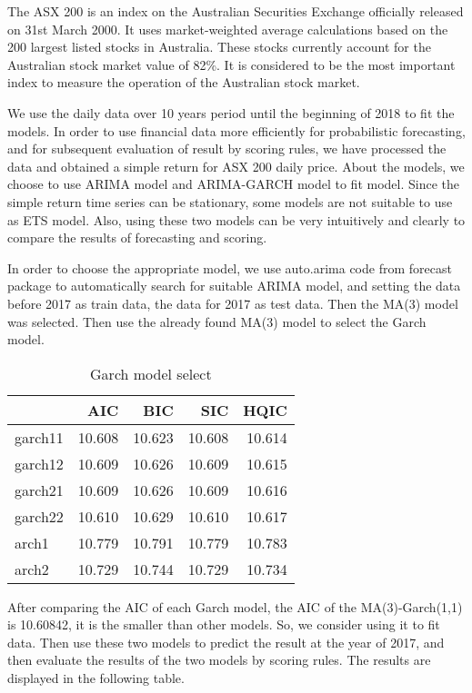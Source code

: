 \documentclass{monashthesis}
\theoremstyle{definition}
\theoremstyle{definition}
\theoremstyle{definition}
\theoremstyle{remark}
\begin{document}
The ASX 200 is an index on the Australian Securities Exchange officially
released on 31st March 2000. It uses market-weighted average
calculations based on the 200 largest listed stocks in Australia. These
stocks currently account for the Australian stock market value of 82\%.
It is considered to be the most important index to measure the operation
of the Australian stock market.

We use the daily data over 10 years period until the beginning of 2018
to fit the models. In order to use financial data more efficiently for
probabilistic forecasting, and for subsequent evaluation of result by
scoring rules, we have processed the data and obtained a simple return
for ASX 200 daily price. About the models, we choose to use ARIMA model
and ARIMA-GARCH model to fit model. Since the simple return time series
can be stationary, some models are not suitable to use as ETS model.
Also, using these two models can be very intuitively and clearly to
compare the results of forecasting and scoring.

In order to choose the appropriate model, we use auto.arima code from
forecast package to automatically search for suitable ARIMA model, and
setting the data before 2017 as train data, the data for 2017 as test
data. Then the MA(3) model was selected. Then use the already found
MA(3) model to select the Garch model.

\begin{table}

\caption{\label{tab:table1}Garch model select}
\centering
\begin{tabular}[t]{lrrrr}
\toprule
  & AIC & BIC & SIC & HQIC\\
\midrule
garch11 & 10.608 & 10.623 & 10.608 & 10.614\\
garch12 & 10.609 & 10.626 & 10.609 & 10.615\\
garch21 & 10.609 & 10.626 & 10.609 & 10.616\\
garch22 & 10.610 & 10.629 & 10.610 & 10.617\\
arch1 & 10.779 & 10.791 & 10.779 & 10.783\\
arch2 & 10.729 & 10.744 & 10.729 & 10.734\\
\bottomrule
\end{tabular}
\end{table}

After comparing the AIC of each Garch model, the AIC of the
MA(3)-Garch(1,1) is 10.60842, it is the smaller than other models. So,
we consider using it to fit data. Then use these two models to predict
the result at the year of 2017, and then evaluate the results of the two
models by scoring rules. The results are displayed in the following
table.
\end{document}
